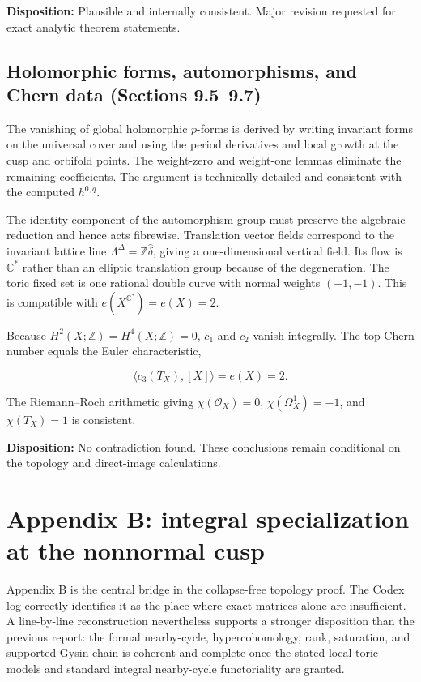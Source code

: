 \documentclass[
  10pt,
  letterpaper,
]{article}
\newcommand{\Z}{\mathbb Z}
\newcommand{\C}{\mathbb C}
\newcommand{\cO}{\mathcal O}
\begin{document}
\textbf{Disposition:} Plausible and internally consistent. Major
revision requested for exact analytic theorem statements.

\subsection{Holomorphic forms, automorphisms, and Chern data (Sections
9.5--9.7)}\label{holomorphic-forms-automorphisms-and-chern-data-sections-9.59.7}

The vanishing of global holomorphic \(p\)-forms is derived by writing
invariant forms on the universal cover and using the period derivatives
and local growth at the cusp and orbifold points. The weight-zero and
weight-one lemmas eliminate the remaining coefficients. The argument is
technically detailed and consistent with the computed \(h^{0,q}\).

The identity component of the automorphism group must preserve the
algebraic reduction and hence acts fibrewise. Translation vector fields
correspond to the invariant lattice line
\(\Lambda^\Delta=\Z\widehat\delta\), giving a one-dimensional vertical
field. Its flow is \(\C^*\) rather than an elliptic translation group
because of the degeneration. The toric fixed set is one rational double
curve with normal weights \((+1,-1)\). This is compatible with
\(e(X^{\C^*})=e(X)=2\).

Because \(H^2(X;\Z)=H^4(X;\Z)=0\), \(c_1\) and \(c_2\) vanish
integrally. The top Chern number equals the Euler characteristic,

\[
\langle c_3(T_X),[X]\rangle=e(X)=2.
\]

The Riemann--Roch arithmetic giving \(\chi(\cO_X)=0\),
\(\chi(\Omega_X^1)=-1\), and \(\chi(T_X)=1\) is consistent.

\textbf{Disposition:} No contradiction found. These conclusions remain
conditional on the topology and direct-image calculations.

\section{Appendix B: integral specialization at the nonnormal
cusp}\label{appendix-b-integral-specialization-at-the-nonnormal-cusp}

Appendix B is the central bridge in the collapse-free topology proof.
The Codex log correctly identifies it as the place where exact matrices
alone are insufficient. A line-by-line reconstruction nevertheless
supports a stronger disposition than the previous report: the formal
nearby-cycle, hypercohomology, rank, saturation, and supported-Gysin
chain is coherent and complete once the stated local toric models and
standard integral nearby-cycle functoriality are granted.
\end{document}

